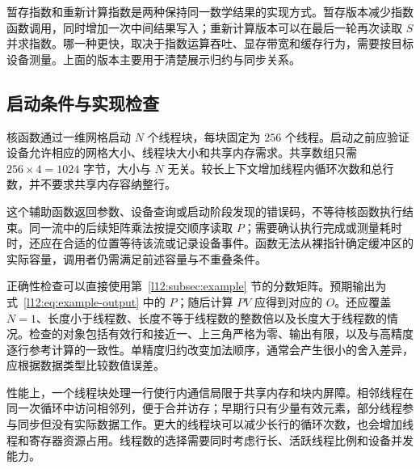 暂存指数和重新计算指数是两种保持同一数学结果的实现方式。暂存版本减少指数函数调用，同时增加一次中间结果写入；重新计算版本可以在最后一轮再次读取 $S$ 并求指数。哪一种更快，取决于指数运算吞吐、显存带宽和缓存行为，需要按目标设备测量。上面的版本主要用于清楚展示归约与同步关系。

\subsection{启动条件与实现检查}

核函数通过一维网格启动 $N$ 个线程块，每块固定为 $256$ 个线程。启动之前应验证设备允许相应的网格大小、线程块大小和共享内存需求。共享数组只需 $256\times4=1024$ 字节，大小与 $N$ 无关。较长上下文增加线程内循环次数和总行数，并不要求共享内存容纳整行。

\noindent\begin{minipage}{\linewidth}

\end{minipage}

这个辅助函数返回参数、设备查询或启动阶段发现的错误码，不等待核函数执行结束。同一流中的后续矩阵乘法按提交顺序读取 $P$；需要确认执行完成或测量耗时时，还应在合适的位置等待该流或记录设备事件。函数无法从裸指针确定缓冲区的实际容量，调用者仍需满足前述容量与不重叠条件。

正确性检查可以直接使用第~\ref{l12:subsec:example} 节的分数矩阵。预期输出为式~\eqref{l12:eq:example-output} 中的 $P$；随后计算 $PV$ 应得到对应的 $O$。还应覆盖 $N=1$、长度小于线程数、长度不等于线程数的整数倍以及长度大于线程数的情况。检查的对象包括有效行和接近一、上三角严格为零、输出有限，以及与高精度逐行参考计算的一致性。单精度归约改变加法顺序，通常会产生很小的舍入差异，应根据数据类型比较数值误差。

性能上，一个线程块处理一行使行内通信局限于共享内存和块内屏障。相邻线程在同一次循环中访问相邻列，便于合并访存；早期行只有少量有效元素，部分线程参与同步但没有实际数据工作。更大的线程块可以减少长行的循环次数，也会增加线程和寄存器资源占用。线程数的选择需要同时考虑行长、活跃线程比例和设备并发能力。
